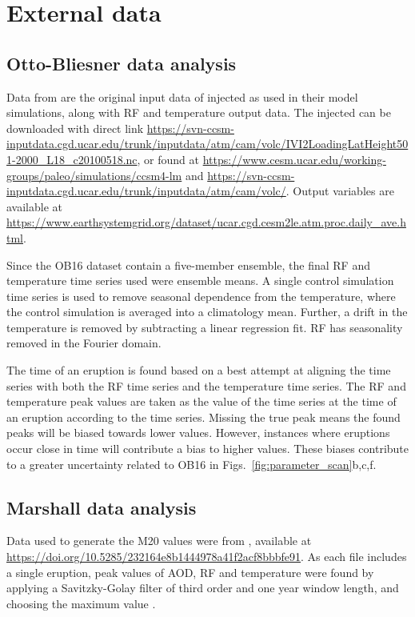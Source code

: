 \documentclass[draft]{agujournal2019}
\newcommand{\iso}[1][i]{{#1}njected \ce{SO2}}
\begin{document}
\section{External data}

\subsection{Otto-Bliesner data analysis}\label{ap:ob16}

Data from  are the original input data of \iso{} as used in
their model simulations, along with RF and temperature output data. The \iso{} can be
downloaded with direct link
\url{https://svn-ccsm-inputdata.cgd.ucar.edu/trunk/inputdata/atm/cam/volc/IVI2LoadingLatHeight501-2000_L18_c20100518.nc},
or found at \url{https://www.cesm.ucar.edu/working-groups/paleo/simulations/ccsm4-lm}
and \url{https://svn-ccsm-inputdata.cgd.ucar.edu/trunk/inputdata/atm/cam/volc/}. Output
variables are available at
\url{https://www.earthsystemgrid.org/dataset/ucar.cgd.cesm2le.atm.proc.daily_ave.html}.

Since the OB16 dataset contain a five-member ensemble, the final RF and temperature time
series used were ensemble means. A single control simulation time series is used to
remove seasonal dependence from the temperature, where the control simulation is
averaged into a climatology mean. Further, a drift in the temperature is removed by
subtracting a linear regression fit. RF has seasonality removed in the Fourier domain.

The time of an eruption is found based on a best attempt at aligning the  time
series with both the RF time series and the temperature time series. The RF and
temperature peak values are taken as the value of the time series at the time of an
eruption according to the  time series. Missing the true peak means the found
peaks will be biased towards lower values. However, instances where eruptions occur
close in time will contribute a bias to higher values. These biases contribute to a
greater uncertainty related to OB16 in Figs.~\ref{fig:parameter_scan}b,c,f.

\subsection{Marshall data analysis}\label{ap:m20}

Data used to generate the M20 values were from , available at
\url{https://doi.org/10.5285/232164e8b1444978a41f2acf8bbbfe91}. As each file includes a
single eruption, peak values of AOD, RF and temperature were found by applying a
Savitzky-Golay filter of third order and one year window length, and choosing the
maximum value \cite{savitzky1964}.
\end{document}
